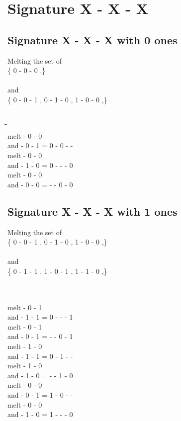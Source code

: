 \documentclass{article}
\begin{document}
\section{Signature X - X - X }
\subsection{Signature X - X - X with 0 ones}
Melting the set of\\
\{ 0  -  0  -  0 ,\}\\\\
and\\
\{ 0  -  0  -  1 , 0  -  1  -  0 , 1  -  0  -  0 ,\}\\\\
\begin{tabbing}
\hspace{3cm}\=\hspace{3cm}\=\hspace{3cm}\\[1cm]
melt  -  0  -  0 \\
and  -  0  -  1 \>
 =  0  -  0  -  - \\[1mm]
melt  -  0  -  0 \\
and  -  1  -  0 \>
 =  0  -  -  -  0 \\[1mm]
melt  -  0  -  0 \\
and  -  0  -  0 \>
 =  -  -  0  -  0 \\[1mm]
\end{tabbing}
\newpage
\subsection{Signature X - X - X with 1 ones}
Melting the set of\\
\{ 0  -  0  -  1 , 0  -  1  -  0 , 1  -  0  -  0 ,\}\\\\
and\\
\{ 0  -  1  -  1 , 1  -  0  -  1 , 1  -  1  -  0 ,\}\\\\
\begin{tabbing}
\hspace{3cm}\=\hspace{3cm}\=\hspace{3cm}\\[1cm]
melt  -  0  -  1 \\
and  -  1  -  1 \>
 =  0  -  -  -  1 \\[1mm]
melt  -  0  -  1 \\
and  -  0  -  1 \>
 =  -  -  0  -  1 \\[1mm]
melt  -  1  -  0 \\
and  -  1  -  1 \>
 =  0  -  1  -  - \\[1mm]
melt  -  1  -  0 \\
and  -  1  -  0 \>
 =  -  -  1  -  0 \\[1mm]
melt  -  0  -  0 \\
and  -  0  -  1 \>
 =  1  -  0  -  - \\[1mm]
melt  -  0  -  0 \\
and  -  1  -  0 \>
 =  1  -  -  -  0 \\[1mm]
\end{tabbing}
\newpage
\end{document}

